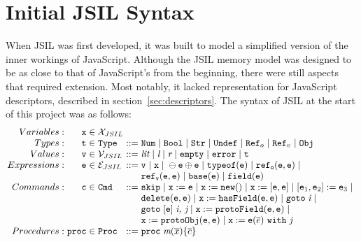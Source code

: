 \documentclass[a4paper,11pt,twoside]{report}
\begin{document}
\section{Initial JSIL Syntax}
When JSIL was first developed, it was built to model a simplified version of the inner workings of JavaScript. Although the JSIL memory model was designed to be as close to that of JavaScript's from the beginning, there were still aspects that required extension. Most notably, it lacked representation for JavaScript descriptors, described in section~\ref{sec:descriptors}.
The syntax of JSIL at the start of this project was as follows:
$$
\arraycolsep=1.5pt
\begin{array}{rrclcl}
Variables : &  \mathtt{x} & \in & \mathcal{X}_{JSIL} \\
Types: & \mathtt{t} & \in & \mathtt{Type} & ::= & \mathtt{Num} \myor \mathtt{Bool} \myor \mathtt{Str} \myor \mathtt{Undef} \myor \mathtt{Ref}_o \myor \mathtt{Ref}_v \myor \mathtt{Obj} \\
Values: & \mathtt{v} & \in & \mathcal{V}_{JSIL} & ::= &\textit{lit} \myor \textit{l} \myor \textit{r} \myor \mathtt{empty} \myor \mathtt{error} \myor \mathtt{t} \\
Expressions: & \mathtt{e} & \in & \mathcal{E}_{JSIL} & ::= &\mathtt{v} \myor \mathtt{x} \myor \ominus \mathtt{e} \oplus \mathtt{e} \myor \mathtt{typeof}(\mathtt{e}) \myor \mathtt{ref_o}(\mathtt{e,e}) \myor \\
& & & & & \mathtt{ref_v}(\mathtt{e,e}) \myor \mathtt{base}(\mathtt{e}) \myor \mathtt{field}(\mathtt{e}) 
\\
Commands: & \mathtt{c} & \in & \mathtt{Cmd} & ::= & \mathtt{skip} \myor \mathtt{x} := \mathtt{e} \myor \mathtt{x} := \mathtt{new}() \myor \mathtt{x} := [\mathtt{e,e}] \myor [\mathtt{e}_1,\mathtt{e}_2] := \mathtt{e}_3 \myor  \\
& & & & & \mathtt{delete}(\mathtt{e,e}) \myor \mathtt{x} := \mathtt{hasField}(\mathtt{e,e}) \myor \mathtt{goto} \hspace{3pt} \textit{i} \myor \\
& & & & & \mathtt{goto} \hspace{3pt} [\mathtt{e}] \hspace{3pt} \textit{i, j} \myor \mathtt{x} := \mathtt{protoField} (\mathtt{e,e}) \myor \\
& & & & & \mathtt{x} := \mathtt{protoObj}(\mathtt{e,e}) \myor \mathtt{x} := \mathtt{e}(\overline{e})\ \mathtt{with}\ \textit{j}
\\
Procedures: & \mathtt{proc} & \in & \mathtt{Proc} & ::= & \mathtt{proc} \hspace{3pt} \textit{m}(\overline{x})\{\overline{c}\}
\end{array}
$$
\end{document}
